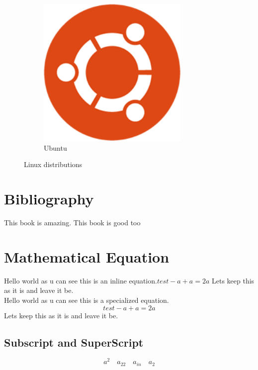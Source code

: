 \documentclass{article}
\begin{document}
\begin{figure}[h]
\begin{subfigure}{0.4\textwidth}
		\includegraphics[width=0.8\textwidth]{ubuntulogo.png}
		\caption{Ubuntu}
	\end{subfigure}
	
	\caption{Linux distributions}
\end{figure}


\section{Bibliography}

This book \cite{deng2009imagenet} is amazing. 
This book \cite{knuth1989mathematical} is good too

\section{Mathematical Equation}

Hello world as u can see this is an inline equation.$ test-a + a = 2a $ Lets keep this as it is and leave it be.\\Hello world as u can see this is a specialized equation.$$ test-a + a = 2a $$ Lets keep this as it is and leave it be.

\subsection{Subscript and SuperScript}
$$ a^2 \quad a_22 \quad a_{in} \quad a_{2} $$
\end{document}
